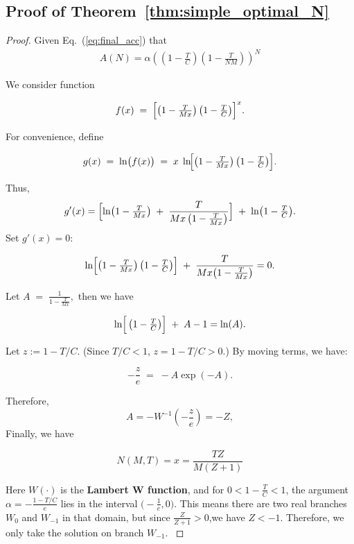 \subsection{Proof of Theorem~\ref{thm:simple_optimal_N}}
\OptimalN*
\begin{proof}
Given Eq.~(\ref{eq:final_acc}) that
\begin{align}
    A(N) =  \alpha\left(\left(1-\frac{T}{C}\right)\left(1-\frac{T}{NM}\right)\right)^N
\end{align}

We consider function

\begin{equation}
    f(x) \;=\; \Bigl[\bigl(1 - \tfrac{T}{Mx}\bigr)\,\bigl(1 - \tfrac{T}{C}\bigr)\Bigr]^{x}.
    \label{eq:f}
\end{equation}



For convenience, define

\[
g(x) \;=\; \ln\bigl(f(x)\bigr) \;=\; x \;\ln\!\Bigl[\bigl(1 - \tfrac{T}{Mx}\bigr)\,\bigl(1 - \tfrac{T}{C}\bigr)\Bigr].
\]

Thus,
\[
g'(x) 
= \Bigl[\ln\bigl(1 - \tfrac{T}{Mx}\bigr) \;+\; \frac{T}{Mx\,\bigl(1 - \tfrac{T}{Mx}\bigr)}\Bigr]
\;+\;
\ln\bigl(1 - \tfrac{T}{C}\bigr).
\]
Set \(g'(x) = 0\):

\[
\ln\Bigl[\bigl(1 - \tfrac{T}{Mx}\bigr)\,\bigl(1 - \tfrac{T}{C}\bigr)\Bigr]
\;+\;
\frac{T}{Mx\bigl(1 - \tfrac{T}{Mx}\bigr)} 
= 0.
\]

Let $A \;=\; \frac{1}{1 - \frac{T}{Mx}},$
then we have

\[
\ln\Bigl[\,\bigl(1 - \tfrac{T}{C}\bigr)\Bigr]
\;+\;
A-1
= \ln(A).
\]

Let \(z := 1 - T/C\). (Since \(T/C < 1\), \(z = 1 - T/C > 0\).) By moving terms, we have:

\[
-\frac{z}{e}\;=\; -A\exp(-A).
\]

Therefore, 
\[
A = -W^{-1}(-\frac{z}{e}) = -Z,
\]
Finally, we have

$$N(M,T) = x = \frac{TZ}{M(Z+1)}$$


Here \(W(\cdot)\) is the \textbf{Lambert W function}, and for \(0 < 1 - \tfrac{T}{C} < 1\), the argument \(\alpha = -\frac{1 - T/C}{e}\) lies in the interval \(\bigl(-\tfrac{1}{e}, 0\bigr)\). This means there are two real branches \(W_0\) and \(W_{-1}\) in that domain, but since $\frac{Z}{Z+1}>0$,we have $Z<-1$. Therefore, we only take the solution on branch \(W_{-1}\).
\label{pr:4.2}
\end{proof}

